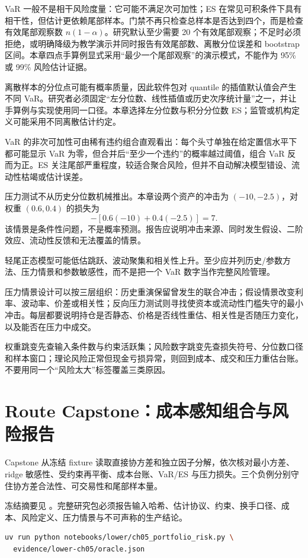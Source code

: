 VaR 一般不是相干风险度量：它可能不满足次可加性；ES 在常见可积条件下具有相干性，但估计更依赖尾部样本。门禁不再只检查总样本是否达到四个，而是检查有效尾部观察数 $n(1-\alpha)$。研究默认至少需要 20 个有效尾部观察；不足时必须拒绝，或明确降级为教学演示并同时报告有效尾部数、离散分位误差和 bootstrap 区间。本章四点手算例显式采用“最少一个尾部观察”的演示模式，不能作为 95\% 或 99\% 风险估计证据。

离散样本的分位点可能有概率质量，因此软件包对 quantile 的插值默认值会产生不同 VaR。研究者必须固定“左分位数、线性插值或历史次序统计量”之一，并让手算例与实现使用同一口径。本章选择左分位数与积分分位数 ES；监管或机构定义可能采用不同离散估计约定。

VaR 的非次可加性可由稀有违约组合直观看出：每个头寸单独在给定置信水平下都可能显示 VaR 为零，但合并后“至少一个违约”的概率越过阈值，组合 VaR 反而为正。ES 关注尾部严重程度，较适合聚合风险，但并不自动解决模型错设、流动性枯竭或估计误差。

压力测试不从历史分位数机械推出。本章设两个资产的冲击为 $(-10,-2.5)$，对权重 $(0.6,0.4)$ 的损失为
\[
 -[0.6(-10)+0.4(-2.5)]=7.
\]
该情景是条件性问题，不是概率预测。报告应说明冲击来源、同时发生假设、二阶效应、流动性反馈和无法覆盖的情景。

轻尾正态模型可能低估跳跃、波动聚集和相关性上升。至少应并列历史/参数方法、压力情景和参数敏感性，而不是把一个 VaR 数字当作完整风险管理。

压力情景设计可以按三层组织：历史重演保留曾发生的联合冲击；假设情景改变利率、波动率、价差或相关性；反向压力测试则寻找使资本或流动性门槛失守的最小冲击。每层都要说明持仓是否静态、价格是否线性重估、相关性是否随压力变化，以及能否在压力中成交。

\begin{implementationnote}[从症状选择工具]
权重跳变先查输入条件数与约束活跃集；风险数字跳变先查损失符号、分位数口径和样本窗口；理论风险正常但现金亏损异常，则回到成本、成交和压力重估台账。不要用同一个“风险太大”标签覆盖三类原因。
\end{implementationnote}

\section{Route Capstone：成本感知组合与风险报告}

Capstone 从冻结 fixture 读取直接协方差和独立因子分解，依次核对最小方差、ridge 敏感性、受约束再平衡、成本台账、VaR/ES 与压力损失。三个负例分别守住协方差合法性、可交易性和尾部样本量。

冻结摘要见 。完整研究包必须报告输入哈希、估计协议、约束、换手口径、成本、风险定义、压力情景与不可声称的生产结论。

\begin{implementationnote}
\begin{lstlisting}[language=bash]
uv run python notebooks/lower/ch05_portfolio_risk.py \
  evidence/lower-ch05/oracle.json
\end{lstlisting}
\end{implementationnote}


